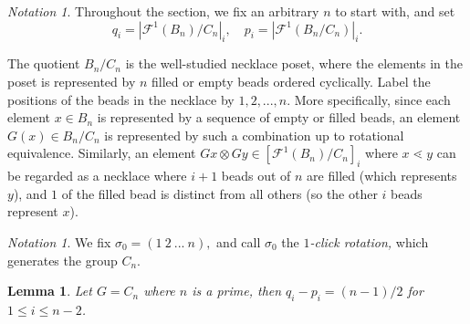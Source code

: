 \documentclass{amsart}
\newtheorem{lem}[thm]{Lemma}
\theoremstyle{remark}
\newtheorem{note}[thm]{Notation}
\begin{document}
\begin{note} Throughout the section, we fix an arbitrary $n$ to start with, and set $$q_i = |\mathcal F^1 (B_n)/C_n|_{i}, \quad p_i = |\mathcal F^1(B_n/C_n)|_{i}. $$  
\end{note}


The quotient $B_n /C_n$ is the well-studied necklace poset, where the elements in the poset is represented by $n$ filled or empty beads ordered cyclically. Label the positions of the beads in the necklace by $1, 2, ..., n$. More specifically, since each element $x \in B_n$ is represented by a sequence of empty or filled beads, an element $G(x) \in B_n/C_n$ is represented by such a combination up to rotational equivalence.  Similarly, an element $Gx \otimes Gy \in [\mathcal F^1(B_n)/C_n]_{i}$ where $x \lessdot y$ can be regarded as a necklace where $i+1$ beads out of $n$ are filled (which represents $y$), and $1$ of the filled bead is distinct from all others (so the other $i$ beads represent $x$).


\begin{note}
We fix $\sigma_0 = (1 \: 2 \: ... \: n),$ and call $\sigma_0$ the {\it $1$-click rotation,} which generates the group $C_n$.
\end{note}

\begin{lem}{\label{lem:cyclicprime}}
Let $G = C_n$ where $n$ is a prime, then $q_i - p_i = (n-1)/2$ for $ 1 \le i \le n-2$. 
\end{lem}
\end{document}
